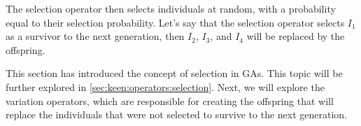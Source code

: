   The selection operator then selects individuals at random, with a probability equal to their
  selection probability.
  Let's say that the selection operator selects \(I_1\) as a survivor to the next generation, then
  \(I_2\), \(I_3\), and \(I_4\) will be replaced by the offspring.

  This section has introduced the concept of selection in GAs.
  This topic will be further explored in \vref{sec:keen:operators:selection}.
  Next, we will explore the variation operators, which are responsible for creating the offspring
  that will replace the individuals that were not selected to survive to the next generation.
